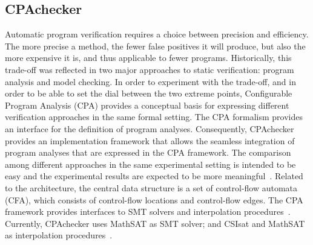 \documentclass[10pt,conference]{IEEEtran}
\begin{document}
\subsection{CPAchecker}
Automatic program verification requires a choice between precision and efficiency. The
more precise a method, the fewer false positives it will produce, but also the more expensive it is, and thus applicable to fewer programs. Historically, this trade-off was
reflected in two major approaches to static verification: program analysis and model
checking. In order to experiment with the trade-off, and in order to be able to set the dial between the two extreme points, Configurable Program Analysis (CPA) provides a conceptual basis for expressing different verification approaches in the same formal setting. The CPA formalism provides an interface for the definition of program analyses. Consequently, CPAchecker provides an implementation framework that allows the seamless integration of program analyses that are expressed in the CPA framework. The comparison among different approaches in the same experimental setting is intended to be easy and the experimental results are expected to be more meaningful~\cite{Beyer2011}. Related to the architecture, the central data structure is a set of control-flow automata (CFA), which consists of control-flow locations and control-flow edges. The CPA framework provides interfaces to SMT solvers and interpolation procedures~\cite{Beyer2011}. Currently, CPAchecker uses MathSAT as SMT solver; and CSIsat and MathSAT as interpolation procedures~\cite{Beyer2011}. 
\end{document}
